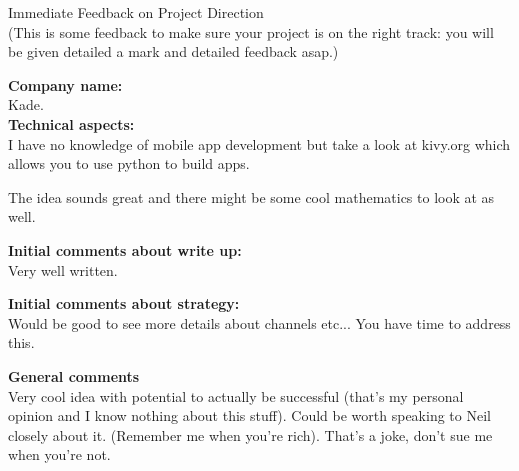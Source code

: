 \documentclass{article}
\begin{document}
\begin{center}
\Huge{Immediate Feedback on Project Direction}\\
\tiny{(This is some feedback to make sure your project is on the right track: you will be given detailed a mark and detailed feedback asap.)}
\end{center}


\normalsize
\textbf{Company name:}\\

Kade. \\

\textbf{Technical aspects:}\\

I have no knowledge of mobile app development but take a look at kivy.org which allows you to use python to build apps.

The idea sounds great and there might be some cool mathematics to look at as well.

\textbf{Initial comments about write up:}\\

Very well written.

\textbf{Initial comments about strategy:}\\

Would be good to see more details about channels etc...
You have time to address this.

\textbf{General comments}\\

Very cool idea with potential to actually be successful (that's my personal opinion and I know nothing about this stuff).
Could be worth speaking to Neil closely about it.
(Remember me when you're rich). That's a joke, don't sue me when you're not.
\end{document}
